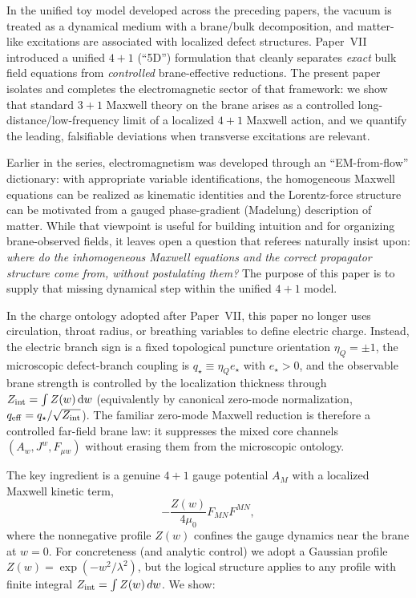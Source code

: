 \documentclass[11pt]{article}
\newcommand{\dd}{\mathrm d}
\newcommand{\Zint}{Z_{\rm int}} %
\newcommand{\etaQ}{\eta_Q}
\newcommand{\estar}{e_\star}
\newcommand{\qstar}{q_\star}
\newcommand{\qeff}{q_{\rm eff}}
\begin{document}
In the unified toy model developed across the preceding papers, the vacuum is
treated as a dynamical medium with a brane/bulk decomposition, and matter-like
excitations are associated with localized defect structures. Paper~VII introduced
a unified \(4+1\) (``5D'') formulation that cleanly separates \emph{exact} bulk
field equations from \emph{controlled} brane-effective reductions. The present
paper isolates and completes the electromagnetic sector of that framework: we
show that standard \(3+1\) Maxwell theory on the brane arises as a controlled
long-distance/low-frequency limit of a localized \(4+1\) Maxwell action, and we
quantify the leading, falsifiable deviations when transverse excitations are
relevant.

Earlier in the series, electromagnetism was developed through an ``EM-from-flow''
dictionary: with appropriate variable identifications, the homogeneous Maxwell
equations can be realized as kinematic identities and the Lorentz-force structure
can be motivated from a gauged phase-gradient (Madelung) description of matter.
While that viewpoint is useful for building intuition and for organizing
brane-observed fields, it leaves open a question that referees naturally insist
upon: \emph{where do the inhomogeneous Maxwell equations and the correct
propagator structure come from, without postulating them?} The purpose of this
paper is to supply that missing dynamical step within the unified \(4+1\) model.

In the charge ontology adopted after Paper~VII, this paper no longer uses
circulation, throat radius, or breathing variables to define electric charge.
Instead, the electric branch sign is a fixed topological puncture orientation
\(\etaQ=\pm1\), the microscopic defect-branch coupling is
\(\qstar\equiv\etaQ\estar\) with \(\estar>0\), and the observable brane strength
is controlled by the localization thickness through
\(\Zint=\int Z(w)\,\dd w\) (equivalently by canonical zero-mode normalization,
\(\qeff=\qstar/\sqrt{\Zint}\)). The familiar zero-mode Maxwell reduction is
therefore a controlled far-field brane law: it suppresses the mixed core channels
\((A_w,J^w,F_{\mu w})\) without erasing them from the microscopic ontology.

The key ingredient is a genuine \(4+1\) gauge potential \(A_M\) with a localized
Maxwell kinetic term,
\[
-\frac{Z(w)}{4\mu_0}F_{MN}F^{MN},
\]
where the nonnegative profile \(Z(w)\) confines the gauge dynamics near the brane
at \(w=0\). For concreteness (and analytic control) we adopt a Gaussian profile
\(Z(w)=\exp(-w^2/\lambda^2)\), but the logical structure applies to any profile
with finite integral \(Z_{\rm int}=\int Z(w)\,dw\). We show:
\end{document}
